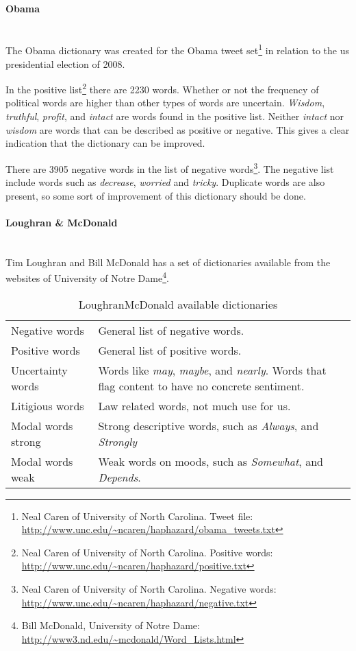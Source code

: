 \paragraph{Obama}
\hspace{0pt}\\
The Obama dictionary was created for the Obama tweet set\footnote{Neal Caren of University of North Carolina. Tweet file:
\url{http://www.unc.edu/~ncaren/haphazard/obama_tweets.txt}} in relation to the
us presidential election of 2008.

In the positive list\footnote{Neal Caren of University of North Carolina.
Positive words: \url{http://www.unc.edu/~ncaren/haphazard/positive.txt}} there
are 2230 words. Whether or not the frequency of political words are higher than
other types of words are uncertain. \textit{Wisdom},
\textit{truthful}, \textit{profit}, and \textit{intact} are words found in
the positive list. Neither \textit{intact} nor \textit{wisdom} are words that
can be described as positive or negative. This gives a clear indication that
the dictionary can be improved.

There are 3905 negative words in the list of negative words\footnote{Neal Caren
of University of North Carolina. Negative words:
\url{http://www.unc.edu/~ncaren/haphazard/negative.txt}}. 
The negative list include words such as \textit{decrease}, \textit{worried} and
\textit{tricky}. Duplicate words are also present, so some sort of improvement
of this dictionary should be done.  
%

\paragraph{Loughran \& McDonald}
\hspace{0pt}\\
Tim Loughran and Bill McDonald has a set of dictionaries available from the
websites of University of Notre Dame\footnote{Bill McDonald, University of
Notre Dame:
\url{http://www3.nd.edu/~mcdonald/Word_Lists.html}}. 

\begin{table}
\centering
\label{tbl:loughran_mcdonald_dictionaries}
\caption{LoughranMcDonald available dictionaries}
\begin{tabular}{ l p{9cm} }
Negative words & General list of negative words. \\
Positive words & General list of positive words. \\
Uncertainty words & Words like \textit{may}, \textit{maybe}, and
\textit{nearly}. Words that flag content to have no concrete sentiment.\\
Litigious words & Law related words, not much use for us. \\
Modal words strong & Strong descriptive words, such as \textit{Always}, and
\textit{Strongly}\\
Modal words weak & Weak words on moods, such as \textit{Somewhat}, and
\textit{Depends}. \\
\end{tabular}
\end{table}

